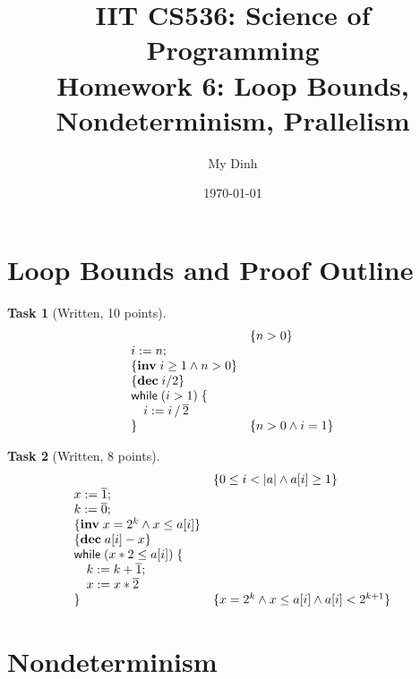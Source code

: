 \documentclass{article}
\title{IIT CS536: Science of Programming\\
  {\large Homework 6: Loop Bounds, Nondeterminism, Prallelism}}
\author{My Dinh}
\date{\today}
\newcommand{\stmt}[1]{\text{\sffamily #1}}
\newcommand{\while}[1]{\stmt{while}\;(#1)\;\{}
\newcommand{\assign}[2]{#1 := #2}
\newcommand{\const}[1]{\overline{#1}}
\newcommand{\inv}[1]{\{\textbf{inv}\;\ensuremath{#1}\}}
\newcommand{\dec}[1]{\{\textbf{dec}\;\ensuremath{#1}\}}
\theoremstyle{task}
\newtheorem{task}{Task}[section]
\begin{document}
\maketitle

\section{Loop Bounds and Proof Outline}

\begin{task}[Written, 10 points]\
    \[
        \begin{array}{l l}
            & \{n > 0\} \\
            \assign{i}{n}; & \\
            \inv{i \geq 1 \wedge n > 0} & \\
            \dec{i / 2} & \\
            \while{i > 1} & \\
            \quad \assign{i}{i\,/\,\const{2}} & \\
            \} & \{n > 0 \wedge i = 1\} \\
        \end{array}
    \]
\end{task}

\begin{task}[Written, 8 points]\
    \[
        \begin{array}{l l}
            & \{0 \leq i < |a| \wedge a[i] \geq 1\} \\
            \assign{x}{\const{1}}; & \\
            \assign{k}{\const{0}}; & \\
            \inv{x = 2^k \wedge x \leq a[i]} & \\
            \dec{a[i] - x} & \\
            \while{x * 2 \leq a[i]} & \\
            \quad \assign{k}{k + \const{1}}; & \\
            \quad \assign{x}{x * \const{2}} & \\
            \} & \{x = 2^k \wedge x \leq a[i] \wedge a[i] < 2^{k+1}\}
        \end{array}
    \]
\end{task}

\section{Nondeterminism}
\end{document}
